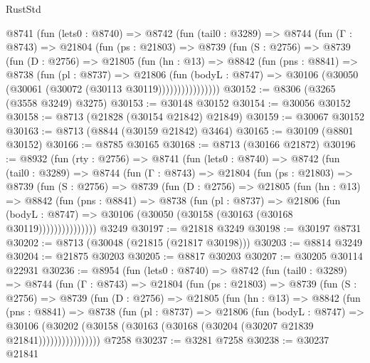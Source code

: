 \begin{lexlean}{RustStd}
\begin{coremodule}
      @8741
        (fun (lets0 : @8740) =>
        @8742
          (fun (tail0 : @3289) =>
          @8744
            (fun (Γ : @8743) =>
            @21804
              (fun (ps : @21803) =>
              @8739
                (fun (S : @2756) =>
                @8739
                  (fun (D : @2756) =>
                  @21805
                    (fun (hn : @13) =>
                    @8842
                      (fun (pns : @8841) =>
                      @8738
                        (fun (pl : @8737) =>
                        @21806
                          (fun (bodyL : @8747) =>
                          @30106 (@30050 (@30061 (@30072 (@30113 @30119))))))))))))))))
@30152 := @8306 (@3265 (@3558 @3249) @3275)
@30153 := @30148 @30152
@30154 := @30056 @30152
@30158 := @8713 (@21828 (@30154 @21842) @21849)
@30159 := @30067 @30152
@30163 := @8713 (@8844 (@30159 @21842) @3464)
@30165 := @30109 (@8801 @30152)
@30166 := @8785 @30165
@30168 := @8713 (@30166 @21872)
@30196 := @8932
    (fun (rty : @2756) =>
    @8741
      (fun (lets0 : @8740) =>
      @8742
        (fun (tail0 : @3289) =>
        @8744
          (fun (Γ : @8743) =>
          @21804
            (fun (ps : @21803) =>
            @8739
              (fun (S : @2756) =>
              @8739
                (fun (D : @2756) =>
                @21805
                  (fun (hn : @13) =>
                  @8842
                    (fun (pns : @8841) =>
                    @8738
                      (fun (pl : @8737) =>
                      @21806
                        (fun (bodyL : @8747) =>
                        @30106 (@30050 (@30158 (@30163 (@30168 @30119)))))))))))))))
    @3249
@30197 := @21818 @3249
@30198 := @30197 @8731
@30202 := @8713 (@30048 (@21815 (@21817 @30198)))
@30203 := @8814 @3249
@30204 := @21875 @30203
@30205 := @8817 @30203
@30207 := @30205 @30114 @22931
@30236 := @8954
    (fun (lets0 : @8740) =>
    @8742
      (fun (tail0 : @3289) =>
      @8744
        (fun (Γ : @8743) =>
        @21804
          (fun (ps : @21803) =>
          @8739
            (fun (S : @2756) =>
            @8739
              (fun (D : @2756) =>
              @21805
                (fun (hn : @13) =>
                @8842
                  (fun (pns : @8841) =>
                  @8738
                    (fun (pl : @8737) =>
                    @21806
                      (fun (bodyL : @8747) =>
                      @30106
                        (@30202
                          (@30158 (@30163 (@30168 (@30204 (@30207 @21839 @21841))))))))))))))))
    @7258
@30237 := @3281 @7258
@30238 := @30237 @21841

\end{coremodule}
\end{lexlean}
